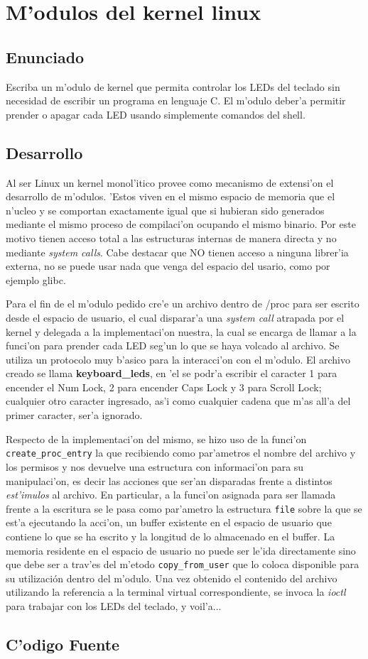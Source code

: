 \section{M'odulos del kernel linux}
\subsection{Enunciado}
Escriba un m'odulo de kernel que permita controlar los LEDs del teclado sin necesidad de escribir un programa en lenguaje C. El m'odulo deber'a permitir prender o apagar cada LED usando simplemente comandos del shell.
\subsection{Desarrollo}
Al ser Linux un kernel monol'itico provee como mecanismo de extensi'on el desarrollo de m'odulos. 'Estos viven en el mismo espacio de memoria que el n'ucleo y se comportan exactamente igual que si hubieran sido generados mediante el mismo proceso de compilaci'on ocupando el mismo binario. Por este motivo tienen acceso total a las estructuras internas de manera directa y no mediante \emph{system calls}. Cabe destacar que NO tienen acceso a ninguna librer'ia externa, no se puede usar nada que venga del espacio del usario, como por ejemplo glibc.

Para el fin de el m'odulo pedido cre'e un archivo dentro de /proc para ser escrito desde el espacio de usuario, el cual disparar'a una \emph{system call} atrapada por el kernel y delegada a la implementaci'on nuestra, la cual se encarga de llamar a la funci'on para prender cada LED seg'un lo que se haya volcado al archivo. Se utiliza un protocolo muy b'asico para la interacci'on con el m'odulo. El archivo creado se llama \textbf{keyboard_leds}, en 'el se podr'a escribir el caracter 1 para encender el Num Lock, 2 para encender Caps Lock y 3 para Scroll Lock; cualquier otro caracter ingresado, as'i como cualquier cadena que m'as all'a del primer caracter, ser'a ignorado.

Respecto de la implementaci'on del mismo, se hizo uso de la funci'on \texttt{create_proc_entry} la que recibiendo como par'ametros el nombre del archivo y los permisos y nos devuelve una estructura con informaci'on para su manipulaci'on, es decir las acciones que ser'an disparadas frente a distintos \emph{est'imulos} al archivo. En particular, a la funci'on asignada para ser llamada frente a la escritura se le pasa como par'ametro la estructura \texttt{file} sobre la que se est'a ejecutando la acci'on, un buffer existente en el espacio de usuario que contiene lo que se ha escrito y la longitud de lo almacenado en el buffer. La memoria residente en el espacio de usuario no puede ser le'ida directamente sino que debe ser a trav'es del m'etodo \texttt{copy_from_user} que lo coloca disponible para su utilización dentro del m'odulo. Una vez obtenido el contenido del archivo utilizando la referencia a la terminal virtual correspondiente, se invoca la \emph{ioctl} para trabajar con los LEDs del teclado, y voil'a...
\subsection{C'odigo Fuente}
    

